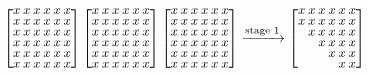 \begin{figure}
  \centering
  \begin{align*}
    \small
    \setlength\arraycolsep{1pt}
    \renewcommand{\arraystretch}{0.7}
    \begin{bmatrix}
      x & x & x & x & x & x \\
      x & x & x & x & x & x \\
      x & x & x & x & x & x \\
      x & x & x & x & x & x \\
      x & x & x & x & x & x \\
      x & x & x & x & x & x \\
    \end{bmatrix}
    \begin{bmatrix}
      x & x & x & x & x & x \\
      x & x & x & x & x & x \\
      x & x & x & x & x & x \\
      x & x & x & x & x & x \\
      x & x & x & x & x & x \\
      x & x & x & x & x & x \\
    \end{bmatrix}
    \begin{bmatrix}
      x & x & x & x & x & x \\
      x & x & x & x & x & x \\
      x & x & x & x & x & x \\
      x & x & x & x & x & x \\
      x & x & x & x & x & x \\
      x & x & x & x & x & x \\
    \end{bmatrix}
        & \xrightarrow{\normalsize \text{stage 1}}
            \small
            \setlength\arraycolsep{1pt}
            \renewcommand{\arraystretch}{0.7}
            \begin{bmatrix}
              x & x & x & x & x & x \\
              x & x & x & x & x & x \\
              & x & x & x & x & x \\
              &   & x & x & x & x \\
              &   &   & x & x & x \\
              &   &   &   & x & x \\
            \end{bmatrix}

\end{align*}
\end{figure}
